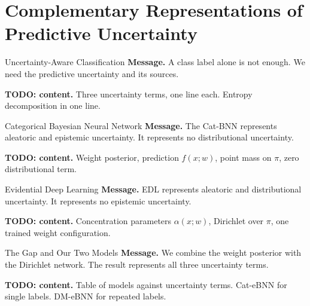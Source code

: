 
\section{Complementary Representations of Predictive Uncertainty}

\begin{frame}{Uncertainty-Aware Classification}
	\textbf{Message.} A class label alone is not enough. We need the predictive uncertainty and its sources.

	\medskip
	\textbf{TODO: content.} Three uncertainty terms, one line each. Entropy decomposition in one line.
\end{frame}

\begin{frame}{Categorical Bayesian Neural Network}
	\textbf{Message.} The Cat-BNN represents aleatoric and epistemic uncertainty. It represents no distributional uncertainty.

	\medskip
	\textbf{TODO: content.} Weight posterior, prediction $f(x;w)$, point mass on $\pi$, zero distributional term.
\end{frame}

\begin{frame}{Evidential Deep Learning}
	\textbf{Message.} EDL represents aleatoric and distributional uncertainty. It represents no epistemic uncertainty.

	\medskip
	\textbf{TODO: content.} Concentration parameters $\alpha(x;w)$, Dirichlet over $\pi$, one trained weight configuration.
\end{frame}

\begin{frame}{The Gap and Our Two Models}
	\textbf{Message.} We combine the weight posterior with the Dirichlet network. The result represents all three uncertainty terms.

	\medskip
	\textbf{TODO: content.} Table of models against uncertainty terms. Cat-eBNN for single labels. DM-eBNN for repeated labels.
\end{frame}
